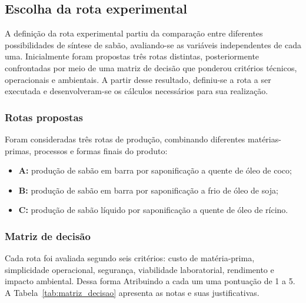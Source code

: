 \subsection{Escolha da rota experimental}

A definição da rota experimental partiu da comparação entre diferentes possibilidades de síntese de sabão, avaliando-se as variáveis independentes de cada uma. Inicialmente foram propostas três rotas distintas, posteriormente confrontadas por meio de uma matriz de decisão que ponderou critérios técnicos, operacionais e ambientais. A partir desse resultado, definiu-se a rota a ser executada e desenvolveram-se os cálculos necessários para sua realização.

\subsubsection{Rotas propostas}

Foram consideradas três rotas de produção, combinando diferentes matérias-primas, processos e formas finais do produto:

\begin{itemize}
    \item \textbf{A:} produção de sabão em barra por saponificação a quente de óleo de coco;
    \item \textbf{B:} produção de sabão em barra por saponificação a frio de óleo de soja;
    \item \textbf{C:} produção de sabão líquido por saponificação a quente de óleo de rícino.
\end{itemize}

\subsubsection{Matriz de decisão}

Cada rota foi avaliada segundo seis critérios: custo de matéria-prima, simplicidade operacional, segurança, viabilidade laboratorial, rendimento e impacto ambiental. Dessa forma Atribuindo a cada um uma pontuação de 1 a 5. A Tabela~\ref{tab:matriz_decisao} apresenta as notas e suas justificativas.

